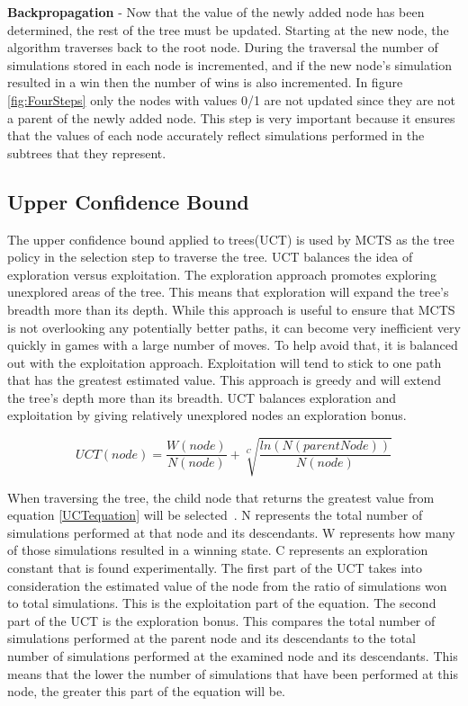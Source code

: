 \documentclass{sig-alternate}
\begin{document}
\textbf{Backpropagation} - Now that the value of the newly added node has been determined, the rest of the tree must be updated. Starting at the new node, the algorithm traverses back to the root node. During the traversal the number of simulations stored in each node is incremented, and if the new node's simulation resulted in a win then the number of wins is also incremented. In figure \ref{fig:FourSteps} only the nodes with values 0/1 are not updated since they are not a parent of the newly added node. This step is very important because it ensures that the values of each node accurately reflect simulations performed in the subtrees that they represent.

\subsection{Upper Confidence Bound}

The upper confidence bound applied to trees(UCT) is used by MCTS as the tree policy in the selection step to traverse the tree. UCT balances the idea of exploration versus exploitation. The exploration approach promotes exploring unexplored areas of the tree. This means that exploration will expand the tree's breadth more than its depth. While this approach is useful to ensure that MCTS is not overlooking any potentially better paths, it can become very inefficient very quickly in games with a large number of moves. To help avoid that, it is balanced out with the exploitation approach. Exploitation will tend to stick to one path that has the greatest estimated value. This approach is greedy and will extend the tree's depth more than its breadth. UCT balances exploration and exploitation by giving relatively unexplored nodes an exploration bonus.  

 \begin{equation}
 \label{UCTequation}
 UCT(node) = \frac{W(node)}{N(node)} + \sqrt[C]{\frac{ln(N(parentNode))}{N(node)}}
 \end{equation}

When traversing the tree, the child node that returns the greatest value from equation \ref{UCTequation} will be selected~\cite{ActionSelection}. N represents the total number of simulations performed at that node and its descendants. W represents how many of those simulations resulted in a winning state. C represents an exploration constant that is found experimentally. The first part of the UCT takes into consideration the estimated value of the node from the ratio of simulations won to total simulations. This is the exploitation part of the equation. The second part of the UCT is the exploration bonus. This compares the total number of simulations performed at the parent node and its descendants to the total number of simulations performed at the examined node and its descendants. This means that the lower the number of simulations that have been performed at this node, the greater this part of the equation will be. 
\end{document}
